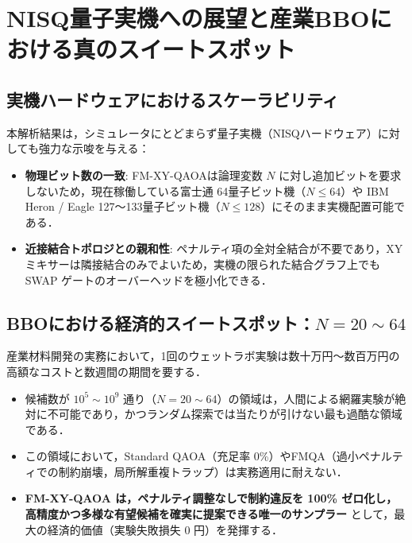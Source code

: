 \documentclass[11pt,a4paper]{ltjsarticle}
\begin{document}
\vspace{-2mm}
\section{NISQ量子実機への展望と産業BBOにおける真のスイートスポット}
\label{sec:practical_implications}
\vspace{-1mm}

\subsection{実機ハードウェアにおけるスケーラビリティ}
本解析結果は，シミュレータにとどまらず量子実機（NISQハードウェア）に対しても強力な示唆を与える：
\begin{itemize}\setlength{\itemsep}{0.5pt}
    \item \textbf{物理ビット数の一致}: FM-XY-QAOAは論理変数 $N$ に対し追加ビットを要求しないため，現在稼働している富士通 64量子ビット機（$N \le 64$）や IBM Heron / Eagle 127〜133量子ビット機（$N \le 128$）にそのまま実機配置可能である．
    \item \textbf{近接結合トポロジとの親和性}: ペナルティ項の全対全結合が不要であり，XYミキサーは隣接結合のみでよいため，実機の限られた結合グラフ上でも SWAP ゲートのオーバーヘッドを極小化できる．
\end{itemize}

\vspace{-1mm}
\subsection{\texorpdfstring{BBOにおける経済的スイートスポット：$N = 20 \sim 64$}{BBOにおける経済的スイートスポット：N = 20 - 64}}
産業材料開発の実務において，1回のウェットラボ実験は数十万円〜数百万円の高額なコストと数週間の期間を要する．
\begin{itemize}\setlength{\itemsep}{0.5pt}
    \item 候補数が $10^5 \sim 10^9$ 通り（$N = 20 \sim 64$）の領域は，人間による網羅実験が絶対に不可能であり，かつランダム探索では当たりが引けない最も過酷な領域である．
    \item この領域において，Standard QAOA（充足率 0\%）やFMQA（過小ペナルティでの制約崩壊，局所解重複トラップ）は実務適用に耐えない．
    \item \textbf{FM-XY-QAOA は，ペナルティ調整なしで制約違反を 100\% ゼロ化し，高精度かつ多様な有望候補を確実に提案できる唯一のサンプラー} として，最大の経済的価値（実験失敗損失 0 円）を発揮する．
\end{itemize}
\end{document}
